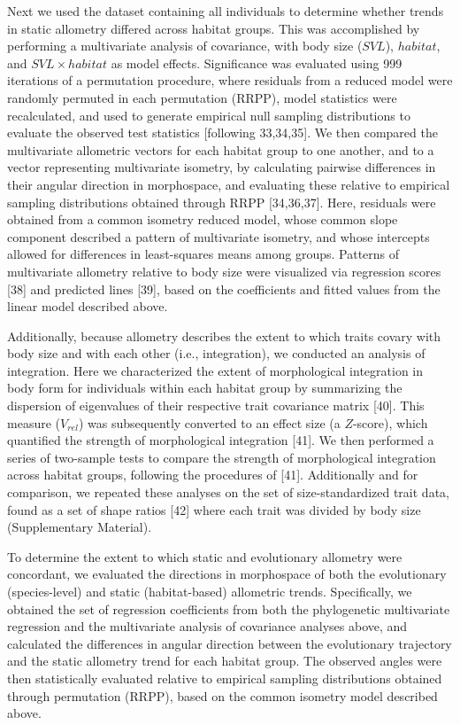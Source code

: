 \documentclass[
  11pt,
]{article}
\begin{document}
Next we used the dataset containing all individuals to determine whether
trends in static allometry differed across habitat groups. This was
accomplished by performing a multivariate analysis of covariance, with
body size (\(SVL\)), \(habitat\), and \(SVL \times habitat\) as model
effects. Significance was evaluated using 999 iterations of a
permutation procedure, where residuals from a reduced model were
randomly permuted in each permutation (RRPP), model statistics were
recalculated, and used to generate empirical null sampling distributions
to evaluate the observed test statistics {[}following 33,34,35{]}. We
then compared the multivariate allometric vectors for each habitat group
to one another, and to a vector representing multivariate isometry, by
calculating pairwise differences in their angular direction in
morphospace, and evaluating these relative to empirical sampling
distributions obtained through RRPP {[}34,36,37{]}. Here, residuals were
obtained from a common isometry reduced model, whose common slope
component described a pattern of multivariate isometry, and whose
intercepts allowed for differences in least-squares means among groups.
Patterns of multivariate allometry relative to body size were visualized
via regression scores {[}38{]} and predicted lines {[}39{]}, based on
the coefficients and fitted values from the linear model described
above. \hfill\break

Additionally, because allometry describes the extent to which traits
covary with body size and with each other (i.e., integration), we
conducted an analysis of integration. Here we characterized the extent
of morphological integration in body form for individuals within each
habitat group by summarizing the dispersion of eigenvalues of their
respective trait covariance matrix {[}40{]}. This measure (\(V_{rel}\))
was subsequently converted to an effect size (a \(Z\)-score), which
quantified the strength of morphological integration {[}41{]}. We then
performed a series of two-sample tests to compare the strength of
morphological integration across habitat groups, following the
procedures of {[}41{]}. Additionally and for comparison, we repeated
these analyses on the set of size-standardized trait data, found as a
set of shape ratios {[}42{]} where each trait was divided by body size
(Supplementary Material). \hfill\break

To determine the extent to which static and evolutionary allometry were
concordant, we evaluated the directions in morphospace of both the
evolutionary (species-level) and static (habitat-based) allometric
trends. Specifically, we obtained the set of regression coefficients
from both the phylogenetic multivariate regression and the multivariate
analysis of covariance analyses above, and calculated the differences in
angular direction between the evolutionary trajectory and the static
allometry trend for each habitat group. The observed angles were then
statistically evaluated relative to empirical sampling distributions
obtained through permutation (RRPP), based on the common isometry model
described above. \hfill\break
\end{document}
